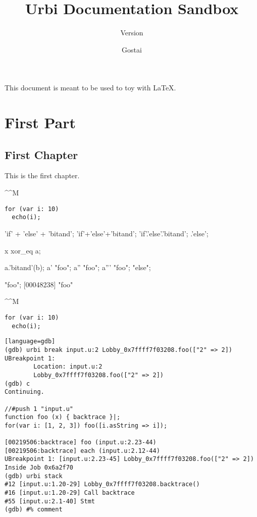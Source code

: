 \documentclass[openright,twoside,11pt]{book}
\title{Urbi Documentation Sandbox}
\subtitle{Version \VcsDescription}
\author{Gostai}
\newcommand{\grammar}[1]{%
  \bnfPre%
  {\^^M}},
                   includerangemarker=false,
                   rangeprefix={\#:},rangesuffix={\^^M},
                   linerange={#1}]
          {tables/urbiscript.bnf}%
  \bnfPost%
}
\begin{document}
\maketitle

This document is meant to be used to toy with \LaTeX{}.

\tableofcontents
\part{First Part}

\chapter{First Chapter}

This is the first chapter.

\grammar{class-exp, lvalue-end, block-exp}

\begin{verbatim}
for (var i: 10)
  echo(i);
\end{verbatim}

\begin{urbiunchecked}
'if' + 'else' + 'bitand';
'if'+'else'+'bitand';
'if'.'else'.'bitand';
.'else';

x xor_eq a;

a.'bitand'(b);
a' "foo";
a'' "foo";
a''' "foo";
"else";

"foo";
[00048238] "foo"
\end{urbiunchecked}

\grammar{}

\begin{verbatim}
for (var i: 10)
  echo(i);
\end{verbatim}

\begin{verbatim}[language=gdb]
(gdb) urbi break input.u:2 Lobby_0x7ffff7f03208.foo(["2" => 2])
UBreakpoint 1:
        Location: input.u:2
        Lobby_0x7ffff7f03208.foo(["2" => 2])
(gdb) c
Continuing.

//#push 1 "input.u"
function foo (x) { backtrace }|;
for(var i: [1, 2, 3]) foo([i.asString => i]);

[00219506:backtrace] foo (input.u:2.23-44)
[00219506:backtrace] each (input.u:2.12-44)
UBreakpoint 1: [input.u:2.23-45] Lobby_0x7ffff7f03208.foo(["2" => 2])
Inside Job 0x6a2f70
(gdb) urbi stack
#12 [input.u:1.20-29] Lobby_0x7ffff7f03208.backtrace()
#16 [input.u:1.20-29] Call backtrace
#55 [input.u:2.1-40] Stmt
(gdb) #% comment
\end{verbatim}
\end{document}
